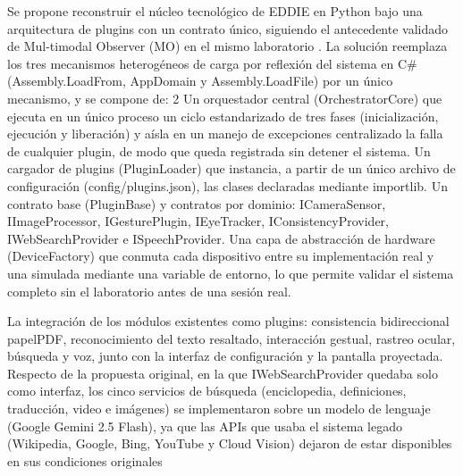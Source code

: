 Se propone reconstruir el núcleo tecnológico de EDDIE en Python bajo una arquitectura de plugins con un contrato único, siguiendo el antecedente validado de Mul-timodal Observer (MO) en el mismo laboratorio \citep{figueroa2025arquitectura}. La solución reemplaza los tres mecanismos heterogéneos de carga por reflexión del sistema en C\#(Assembly.LoadFrom, AppDomain y Assembly.LoadFile) por un único mecanismo, y se compone de: 2 Un orquestador central (OrchestratorCore) que ejecuta en un único proceso un ciclo estandarizado de tres fases (inicialización, ejecución y liberación) y aísla en un manejo de excepciones centralizado la falla de cualquier plugin, de modo que queda registrada sin detener el sistema. Un cargador de plugins (PluginLoader) que instancia, a partir de un único archivo de configuración (config/plugins.json), las clases declaradas mediante importlib. Un contrato base (PluginBase) y contratos por dominio: ICameraSensor, IImageProcessor, IGesturePlugin, IEyeTracker, IConsistencyProvider, IWebSearchProvider e ISpeechProvider. Una capa de abstracción de hardware (DeviceFactory) que conmuta cada dispositivo entre su implementación real y una simulada mediante una variable de entorno, lo que permite validar el sistema completo sin el laboratorio antes de una sesión real.

La integración de los módulos existentes como plugins: consistencia bidireccional papelPDF, reconocimiento del texto resaltado, interacción gestual, rastreo ocular, búsqueda y voz, junto con la interfaz de configuración y la pantalla proyectada. Respecto de la propuesta original, en la que IWebSearchProvider quedaba solo como interfaz, los cinco servicios de búsqueda (enciclopedia, definiciones, traducción, video e imágenes) se implementaron sobre un modelo de lenguaje (Google Gemini 2.5 Flash), ya que las APIs que usaba el sistema legado (Wikipedia, Google, Bing, YouTube y Cloud Vision) dejaron de estar disponibles en sus condiciones originales






